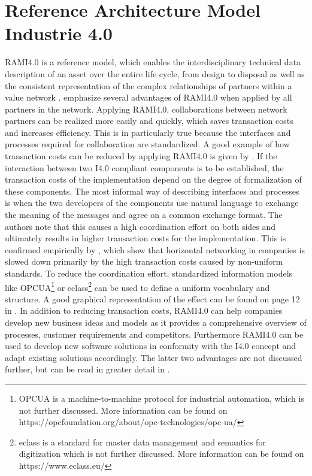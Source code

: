 \section{Reference Architecture Model Industrie 4.0} \label{sec:rami40}
\ac{RAMI4.0} is a reference model, which enables the interdisciplinary technical data description of an asset over the entire life cycle, from design to disposal as well as the consistent representation of the complex relationships of partners within a value network \cite[p. 4]{Heidel2017ReferenzarchitekturmodellIndustrie4.0Komponente}. \citet[p. 23]{Arnold2018DigitaleMittelstand} emphasize several advantages of \ac{RAMI4.0} when applied by all partners in the network. Applying \ac{RAMI4.0}, collaborations between network partners can be realized more easily and quickly, which saves transaction costs and increases efficiency. This is in particularly true because the interfaces and processes required for collaboration are standardized. A good example of how transaction costs can be reduced by applying \ac{RAMI4.0} is given by \citet[p. 11]{Bayha2020DescribingComponents}. If the interaction between two \ac{I4.0} compliant components is to be established, the transaction costs of the implementation depend on the degree of formalization of these components. The most informal way of describing interfaces and processes is when the two developers of the components use natural language to exchange the meaning of the messages and agree on a common exchange format. The authors note that this causes a high coordination effort on both sides and ultimately results in higher transaction costs for the implementation. This is confirmed empirically by \citet[p. 14]{Arnold2018DigitaleMittelstand}, which show that horizontal networking in companies is slowed down primarily by the high transaction costs caused by non-uniform standards. To reduce the coordination effort, standardized information models like \ac{OPCUA}\footnote{\ac{OPCUA} is a machine-to-machine protocol for industrial automation, which is not further discussed. More information can be found on https://opcfoundation.org/about/opc-technologies/opc-ua/} or eclass\footnote{eclass is a standard for master data management and semantics for digitization which is not further discussed. More information can be found on https://www.eclass.eu/} can be used to define a uniform vocabulary and structure. A good graphical representation of the effect can be found on page 12 in \citet{Bayha2020DescribingComponents}. In addition to reducing transaction costs, \ac{RAMI4.0} can help companies develop new business ideas and models as it provides a comprehensive overview of processes, customer requirements and competitors. Furthermore \ac{RAMI4.0} can be used to develop new software solutions in conformity with the \ac{I4.0} concept and adapt existing solutions accordingly. The latter two advantages are not discussed further, but can be read in greater detail in \citet[p. 24 ff]{Arnold2018DigitaleMittelstand}.


